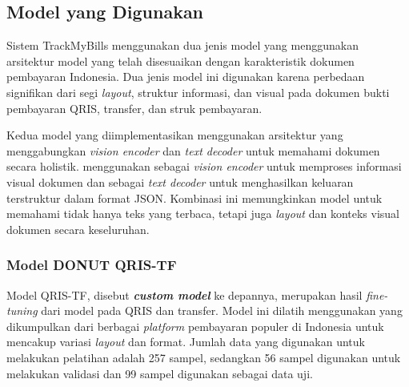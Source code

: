 \subsection{Model yang Digunakan}
\label{subsec:model-yang-digunakan}

Sistem TrackMyBills menggunakan dua jenis model yang menggunakan arsitektur model \donut{} yang telah disesuaikan dengan karakteristik dokumen pembayaran Indonesia. Dua jenis model ini digunakan karena perbedaan signifikan dari segi \emph{layout}, struktur informasi, dan visual pada dokumen bukti pembayaran QRIS, transfer, dan struk pembayaran.

Kedua model yang diimplementasikan menggunakan arsitektur \donut{} yang menggabungkan \emph{vision encoder} dan \emph{text decoder} untuk memahami dokumen secara holistik. \donut{} menggunakan \swin{} sebagai \emph{vision encoder} untuk memproses informasi visual dokumen dan \bart{} sebagai \emph{text decoder} untuk menghasilkan keluaran terstruktur dalam format JSON. Kombinasi ini memungkinkan model untuk memahami tidak hanya teks yang terbaca, tetapi juga \emph{layout} dan konteks visual dokumen secara keseluruhan.


\subsubsection{Model DONUT QRIS-TF}
\label{subsubsec:donut-qris-tf}

Model \donut{} QRIS-TF, disebut \textbf{\emph{custom model}} ke depannya, merupakan hasil \emph{fine-tuning} dari model \donutcord{} pada \dataset{} QRIS dan transfer. Model ini dilatih menggunakan \dataset{} yang dikumpulkan dari berbagai \emph{platform} pembayaran populer di Indonesia untuk mencakup variasi \emph{layout} dan format. Jumlah data yang digunakan untuk melakukan pelatihan adalah 257 sampel, sedangkan 56 sampel digunakan untuk melakukan validasi dan 99 sampel digunakan sebagai data uji.

